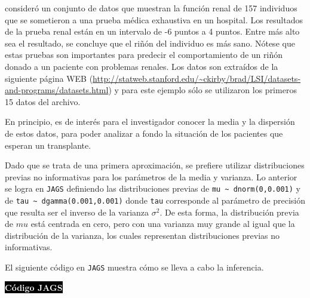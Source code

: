 \begin{Eje}\label{Eje-Renal}
 consideró un conjunto de datos que muestran la función renal de 157 individuos que se sometieron a una prueba médica exhaustiva en un hospital. Los resultados de la prueba renal están en un intervalo de -6 puntos a 4 puntos. Entre más alto sea el resultado, se concluye que el riñón del individuo es más sano. Nótese que estas pruebas son importantes para predecir el comportamiento de un riñón donado a un paciente con problemas renales. Los datos son extraídos de la siguiente página WEB  (\url{http://statweb.stanford.edu/~ckirby/brad/LSI/datasets-and-programs/datasets.html}) y para este ejemplo sólo se utilizaron los primeros 15 datos del archivo.

En principio, es de interés para el investigador conocer la media y la dispersión de estos datos, para poder analizar a fondo la situación de los pacientes que esperan un transplante.

Dado que se trata de una primera aproximación, se prefiere utilizar distribuciones previas no informativas para los parámetros de la media y varianza. Lo anterior se logra en \verb'JAGS' definiendo las distribuciones previas de \verb"mu ~ dnorm(0,0.001)" y de \verb"tau ~ dgamma(0.001,0.001)" donde \verb"tau" corresponde al parámetro de precisión que resulta ser el inverso de la varianza $\sigma^2$. De esta forma, la distribución previa de $mu$ está centrada en cero, pero con una varianza muy grande al igual que la distribución de la varianza, los cuales representan distribuciones previas no informativas.

El siguiente código en \verb'JAGS' muestra cómo se lleva a cabo la inferencia.

\colorbox{black}{\textcolor{white}{\textbf{Código JAGS}}}
\begin{knitrout}
\color{fgcolor}\begin{kframe}
\begin{alltt}
 \hlkwb{<-} \hlstd{()\{}
     \hlopt{:}
  \hlstd{\{}
     \hlopt{~} 
  \hlstd{\}}
   \hlopt{~} \hlstd{(}\hlstd{,}\hlstd{);}
   \hlkwb{<-} \hlopt{/}
   \hlopt{~} \hlstd{(}\hlstd{,} \hlstd{)}
\hlstd{\}}

 \hlkwb{<-} 
 \hlkwb{<-} \hlstd{(}\hlstd{,} \hlopt{-}\hlstd{,} \hlopt{-}\hlstd{,} \hlopt{-}\hlstd{,} \hlstd{,} \hlopt{-}\hlstd{,}
       \hlopt{-}\hlstd{,} \hlopt{-}\hlstd{,} \hlstd{,} \hlstd{,} \hlstd{,} \hlstd{,}
       \hlopt{-}\hlstd{,} \hlopt{-}\hlstd{,} \hlstd{)}


\end{alltt}
\end{kframe}
\end{knitrout}
\end{Eje}
